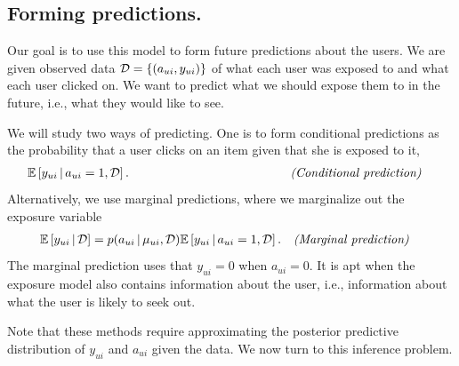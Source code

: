 \subsection{Forming predictions.}  

Our goal is to use this model to form
future predictions about the users.  We are given observed data
$\mathcal{D} = \{(a_{ui}, y_{ui})\}$ of what each user was exposed to and
what each user clicked on.  We want to predict what we should expose
them to in the future, i.e., what they would like to see.

We will study two ways of predicting. One is to form conditional
predictions as the probability that a user clicks on an item given
that she is exposed to it,
\begin{align}
  &\mathbb{E}\left[y_{ui} \,\vert\, a_{ui} = 1, \mathcal{D}\right].  &\quad\quad\quad\quad\quad\quad\quad\quad\quad\quad\quad\quad\textit{(Conditional prediction)}&
  \label{eq:conditional-prediction}
\end{align}
Alternatively, we use marginal predictions, where we marginalize out
the exposure variable
\begin{align}
  &\mathbb{E}\left[y_{ui} \,\vert\, \mathcal{D}\right] = p(a_{ui} \,\vert\, \mu_{ui}, \mathcal{D}) \mathbb{E}\left[y_{ui} \,\vert\, a_{ui} =
  1, \mathcal{D}\right]. & \textit{(Marginal prediction)}&
  \label{eq:marginal_preds}
\end{align}
The marginal prediction uses that $y_{ui} = 0$ when $a_{ui} = 0$.  It
is apt when the exposure model also contains information about the
user, i.e., information about what the user is likely to seek out.





Note that these methods require approximating the posterior predictive
distribution of $y_{ui}$ and $a_{ui}$ given the data.  We now turn to
this inference problem.



